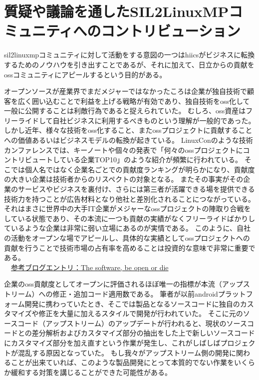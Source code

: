 \section{質疑や議論を通したSIL2LinuxMPコミュニティへのコントリビューション}
\label{contribution}
\acrshort{sil2linuxmp}コミュニティに対して活動をする意図の一つは\acrshort{hiics}がビジネスに転換するためのノウハウを引き出すことであるが、それに加えて、日立からの貢献を\acrshort{oss}コミュニティにアピールするという目的がある。
\par
オープンソースが産業界でまだメジャーではなかったころは企業が独自技術で顧客を広く囲い込むことで利益を上げる戦略が有効であり、独自技術を\acrshort{oss}化して一般に公開することは利敵行為であると捉えられていた。
むしろ、\acrshort{oss}資産はフリーライドして自社ビジネスに利用するべきものという理解が一般的であった。
しかし近年、様々な技術を\acrshort{oss}化すること、また\acrshort{oss}プロジェクトに貢献することへの価値あるいはビジネスモデルの転換が起きている。
LinuxConのような技術カンファレンスでは、キーノートや個々の発表で「何々の\acrshort{oss}プロジェクトにコントリビュートしている企業TOP10」のような紹介が頻繁に行われている。
そこでは個人名ではなく企業名ごとでの貢献度ランキングが明らかになり、貢献度の大きい企業は技術者からのリスペクトの対象となる。
またその事実がその企業のサービスやビジネスを裏付け、さらには第三者が活躍できる場を提供できる技術力を持つことが広告材料となり他社と差別化されることにつながっている。
それはまさに世界中の大手IT企業がメジャーな\acrshort{oss}プロジェクトの陣取り合戦をしている状態であり、その本流に一つも貢献の実績がなくフリーライドばかりしているような企業は非常に弱い立場にあるのが実情である。
このように、自社の活動をオープンな場でアピールし、具体的な実績として\acrshort{oss}プロジェクトへの貢献を行うことで技術市場の占有率を高めることは投資的な意味で非常に重要である。\\
　\href{https://wirelesswire.jp/2016/01/49267/}{参考ブログエントリ：The software, be open or die} \cite{die}
\par
企業の\acrshort{oss}貢献度としてオープンに評価されるほぼ唯一の指標が本流（アップストリーム）への修正・追加コード適用数である。
筆者が以前\acrshort{android}プラットフォーム開発に携わっていたとき、そこでは製品となるソースコードに独自のカスタマイズや修正を大量に加えるスタイルで開発が行われていた。
そこに元のソースコード（アップストリーム）のアップデートが行われると、現状のソースコードとの差分解析およびカスタマイズ部分の抽出をした上で新しいソースコードにカスタマイズ部分を加え直すという作業が発生し、これがしばしばプロジェクトが混乱する原因となっていた。
もし我々がアップストリーム側の開発に関わることが出来ていれば、このような製品開発にとって本質的でない作業をいくらか緩和する対策を講じることができた可能性がある。
